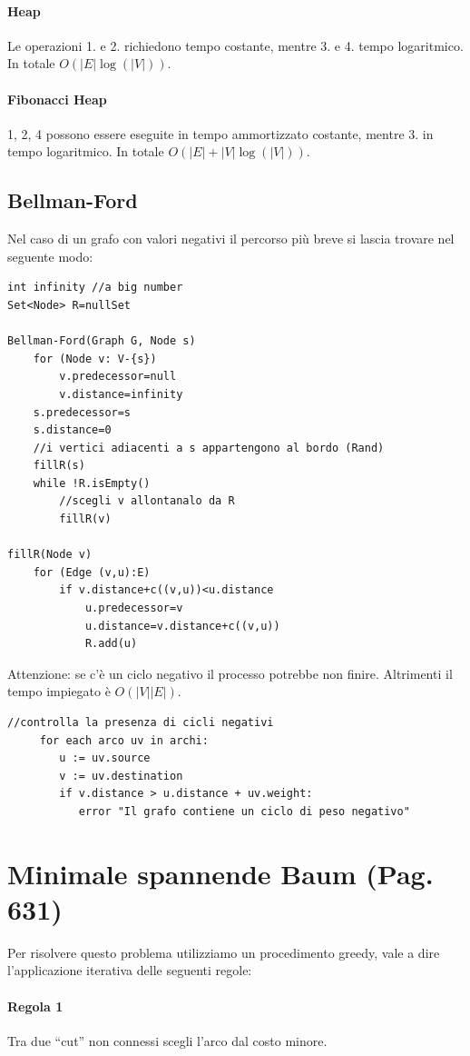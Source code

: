 \documentclass[a4paper]{book}
\newcommand{\lstIndent}{4}
\begin{document}
\paragraph*{Heap}
Le operazioni 1. e 2. richiedono tempo costante, mentre 3. e 4. tempo logaritmico. In totale $O(|E|\log (|V|))$.
\paragraph*{Fibonacci Heap}
1, 2, 4 possono essere eseguite in tempo ammortizzato costante, mentre 3. in tempo logaritmico. In totale $O(|E|+|V|\log (|V|))$.
\subsection{Bellman-Ford}
Nel caso di un grafo con valori negativi il percorso più breve si lascia trovare nel seguente modo:
\begin{lstlisting}[tabsize=\lstIndent]
int infinity //a big number
Set<Node> R=nullSet
	
Bellman-Ford(Graph G, Node s)
	for (Node v: V-{s})
		v.predecessor=null
		v.distance=infinity
	s.predecessor=s
	s.distance=0
	//i vertici adiacenti a s appartengono al bordo (Rand)
	fillR(s)
	while !R.isEmpty()
		//scegli v allontanalo da R
		fillR(v)
		
fillR(Node v)
	for (Edge (v,u):E)
		if v.distance+c((v,u))<u.distance
			u.predecessor=v
			u.distance=v.distance+c((v,u))
			R.add(u)				
\end{lstlisting}
Attenzione: se c'è un ciclo negativo il processo potrebbe non finire. Altrimenti il tempo impiegato è $O(|V||E|)$.
\begin{lstlisting}[tabsize=\lstIndent]
     //controlla la presenza di cicli negativi
     for each arco uv in archi:
        u := uv.source
        v := uv.destination
        if v.distance > u.distance + uv.weight:
           error "Il grafo contiene un ciclo di peso negativo"
\end{lstlisting}
\section{Minimale spannende Baum (Pag. 631)}
Per risolvere questo problema utilizziamo un procedimento greedy, vale a dire l'applicazione iterativa delle seguenti regole:
\paragraph*{Regola 1} Tra due ``cut'' non connessi scegli l'arco dal costo minore.
\end{document}
